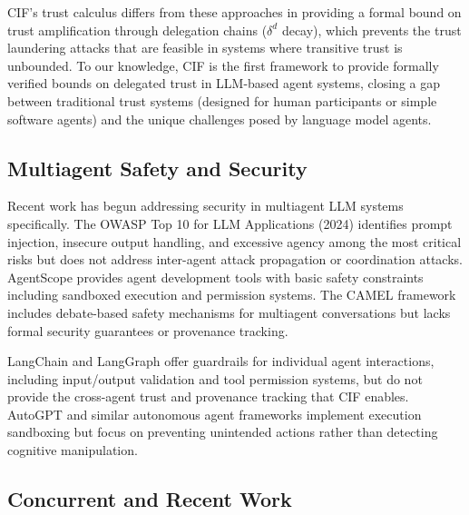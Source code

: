 \documentclass[
]{article}
\begin{document}
CIF's trust calculus differs from these approaches in providing a formal
bound on trust amplification through delegation chains (\(\delta^d\)
decay), which prevents the trust laundering attacks that are feasible in
systems where transitive trust is unbounded. To our knowledge, CIF is
the first framework to provide formally verified bounds on delegated
trust in LLM-based agent systems, closing a gap between traditional
trust systems (designed for human participants or simple software
agents) and the unique challenges posed by language model agents.

\subsection{Multiagent Safety and
Security}\label{multiagent-safety-and-security}

Recent work has begun addressing security in multiagent LLM systems
specifically. The OWASP Top 10 for LLM Applications (2024) identifies
prompt injection, insecure output handling, and excessive agency among
the most critical risks but does not address inter-agent attack
propagation or coordination attacks. AgentScope \cite{gao2024agentscope}
provides agent development tools with basic safety constraints including
sandboxed execution and permission systems. The CAMEL framework
\cite{li2023camel} includes debate-based safety mechanisms for
multiagent conversations but lacks formal security guarantees or
provenance tracking.

LangChain and LangGraph offer guardrails for individual agent
interactions, including input/output validation and tool permission
systems, but do not provide the cross-agent trust and provenance
tracking that CIF enables. AutoGPT and similar autonomous agent
frameworks implement execution sandboxing but focus on preventing
unintended actions rather than detecting cognitive manipulation.

\subsection{Concurrent and Recent
Work}\label{concurrent-and-recent-work}
\end{document}
